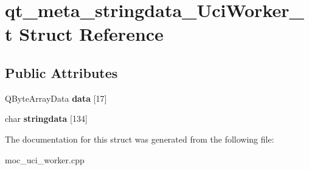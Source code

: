 \hypertarget{structqt__meta__stringdata__UciWorker__t}{\section{qt\-\_\-meta\-\_\-stringdata\-\_\-\-Uci\-Worker\-\_\-t Struct Reference}
\label{structqt__meta__stringdata__UciWorker__t}
}
\subsection*{Public Attributes}
\begin{DoxyCompactItemize}
\item 
\hypertarget{structqt__meta__stringdata__UciWorker__t_a68085ff9484184635d273a288e32ed37}{Q\-Byte\-Array\-Data {\bfseries data} \mbox{[}17\mbox{]}}\label{structqt__meta__stringdata__UciWorker__t_a68085ff9484184635d273a288e32ed37}

\item 
\hypertarget{structqt__meta__stringdata__UciWorker__t_a11fb3005aeaad3203dad5379458b8586}{char {\bfseries stringdata} \mbox{[}134\mbox{]}}\label{structqt__meta__stringdata__UciWorker__t_a11fb3005aeaad3203dad5379458b8586}

\end{DoxyCompactItemize}


The documentation for this struct was generated from the following file\-:\begin{DoxyCompactItemize}
\item 
moc\-\_\-uci\-\_\-worker.\-cpp\end{DoxyCompactItemize}
